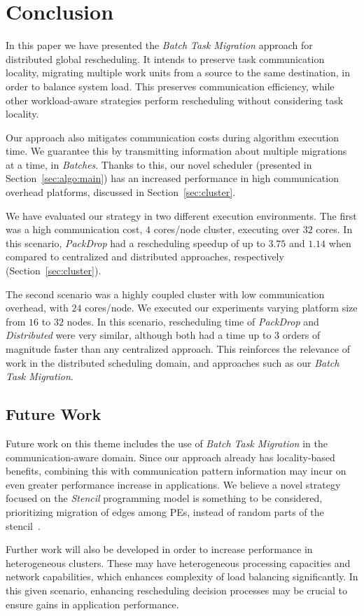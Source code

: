 \section{Conclusion} \label{sec:conclusion}

In this paper we have presented the \textit{Batch Task Migration} approach for distributed global rescheduling.
It intends to preserve task communication locality, migrating multiple work units from a source to the same destination, in order to balance system load.
This preserves communication efficiency, while other workload-aware strategies perform rescheduling without considering task locality.

Our approach also mitigates communication costs during algorithm execution time.
We guarantee this by transmitting information about multiple migrations at a time, in \textit{Batches}.
Thanks to this, our novel scheduler (presented in Section~\ref{sec:algo:main}) has an increased performance in high communication overhead platforms, discussed in Section~\ref{sec:cluster}.

We have evaluated our strategy in two different execution environments. 
The first was a high communication cost, $4$ cores/node cluster, executing over $32$ cores.
In this scenario, \textit{PackDrop} had a rescheduling speedup of up to $3.75$ and $1.14$ when compared to centralized and distributed approaches, respectively (Section~\ref{sec:cluster}).

The second scenario was a highly coupled cluster with low communication overhead, with $24$ cores/node.
We executed our experiments varying platform size from $16$ to $32$ nodes.
In this scenario, rescheduling time of \textit{PackDrop} and \textit{Distributed} were very similar, although both had a time up to $3$ orders of magnitude faster than any centralized approach. %
This reinforces the relevance of work in the distributed scheduling domain, and approaches such as our \textit{Batch Task Migration}.

\subsection{Future Work}

Future work on this theme includes the use of \textit{Batch Task Migration} in the communication-aware domain.
Since our approach already has locality-based benefits, combining this with communication pattern information may incur on even greater performance increase in applications.
We believe a novel strategy focused on the \textit{Stencil} programming model is something to be considered, prioritizing migration of edges among PEs, instead of random parts of the stencil~\cite{stenciltiling}.

Further work will also be developed in order to increase performance in heterogeneous clusters.
These may have heterogeneous processing capacities and network capabilities, which enhances complexity of load balancing significantly.
In this given scenario, enhancing rescheduling decision processes may be crucial to ensure gains in application performance.